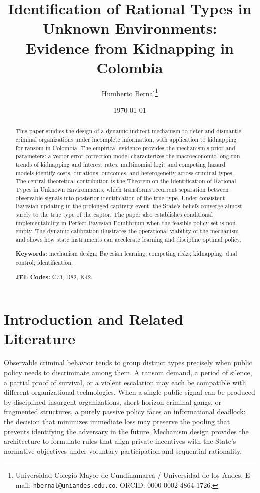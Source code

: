 \documentclass[12pt,a4paper]{article}
\title{\textbf{Identification of Rational Types in Unknown Environments:\\
Evidence from Kidnapping in Colombia}}
\author{Humberto Bernal\thanks{%
Universidad Colegio Mayor de Cundinamarca / Universidad de los Andes.
E-mail: \texttt{hbernal@uniandes.edu.co}.
ORCID: 0000-0002-4864-1726.}}
\date{\today}
\theoremstyle{plain}
\theoremstyle{definition}
\theoremstyle{remark}
\newcommand{\1}{\mathbf{1}}
\begin{document}
\maketitle
\thispagestyle{fancy}

\begin{abstract}
\noindent This paper studies the design of a dynamic indirect mechanism to deter and
dismantle criminal organizations under incomplete information, with application to
kidnapping for ransom in Colombia. The empirical evidence provides the mechanism's prior
and parameters: a vector error correction model characterizes the macroeconomic
long-run trends of kidnapping and interest rates; multinomial logit and competing
hazard models identify costs, durations, outcomes, and heterogeneity across criminal
types. The central theoretical contribution is the Theorem on the Identification of
Rational Types in Unknown Environments, which transforms recurrent separation between
observable signals into posterior identification of the true type. Under consistent
Bayesian updating in the prolonged captivity event, the State's beliefs converge
almost surely to the true type of the captor. The paper also establishes conditional
implementability in Perfect Bayesian Equilibrium when the feasible policy set is
non-empty. The dynamic calibration illustrates the operational viability of the
mechanism and shows how state instruments can accelerate learning and discipline
optimal policy.

\medskip\noindent\textbf{Keywords:} mechanism design; Bayesian learning; competing risks;
kidnapping; dual control; identification.

\medskip\noindent\textbf{JEL Codes:} C73, D82, K42.
\end{abstract}

\newpage

\section{Introduction and Related Literature}
\label{sec:intro}

Observable criminal behavior tends to group distinct types precisely when public policy
needs to discriminate among them. A ransom demand, a period of silence, a partial
proof of survival, or a violent escalation may each be compatible with different
organizational technologies. When a single public signal can be produced by disciplined
insurgent organizations, short-horizon criminal gangs, or fragmented structures, a
purely passive policy faces an informational deadlock: the decision that minimizes
immediate loss may preserve the pooling that prevents identifying the adversary in
the future. Mechanism design provides the architecture to formulate rules that align
private incentives with the State's normative objectives under voluntary participation
and sequential rationality.
\end{document}
